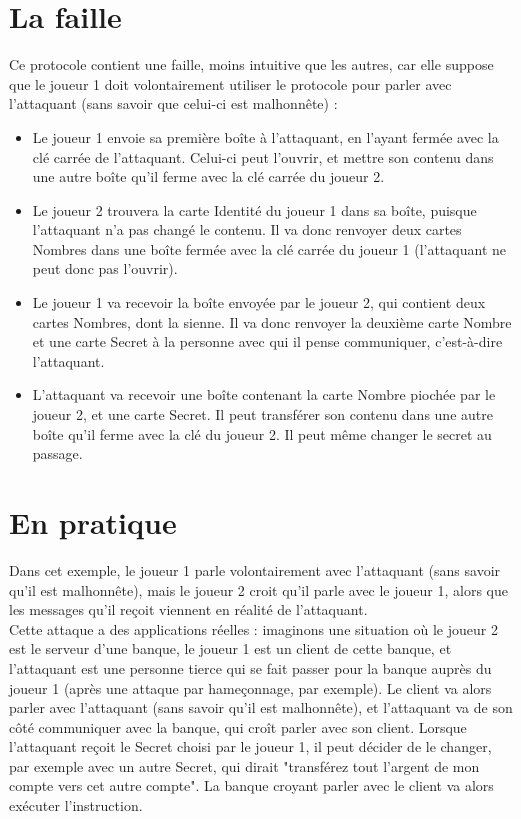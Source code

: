 \documentclass[a4paper,10pt]{article}
\begin{document}
\section{La faille}
Ce protocole contient une faille, moins intuitive que les autres, car elle suppose que le joueur 1 doit volontairement utiliser le protocole pour parler avec l'attaquant (sans savoir que celui-ci est malhonnête) :
\begin{itemize}
	\item Le joueur 1 envoie sa première boîte à l'attaquant, en l'ayant fermée avec la clé carrée de l'attaquant. Celui-ci peut l'ouvrir, et mettre son contenu dans une autre boîte qu'il ferme avec la clé carrée du joueur 2.
	\item Le joueur 2 trouvera la carte Identité du joueur 1 dans sa boîte, puisque l'attaquant n'a pas changé le contenu. Il va donc renvoyer deux cartes Nombres dans une boîte fermée avec la clé carrée du joueur 1 (l'attaquant ne peut donc pas l'ouvrir).
	\item Le joueur 1 va recevoir la boîte envoyée par le joueur 2, qui contient deux cartes Nombres, dont la sienne. Il va donc renvoyer la deuxième carte Nombre et une carte Secret à la personne avec qui il pense communiquer, c'est-à-dire l'attaquant.
	\item L'attaquant va recevoir une boîte contenant la carte Nombre piochée par le joueur 2, et une carte Secret. Il peut transférer son contenu dans une autre boîte qu'il ferme avec la clé du joueur 2. Il peut même changer le secret au passage.
\end{itemize}

\section{En pratique}
Dans cet exemple, le joueur 1 parle volontairement avec l'attaquant (sans savoir qu'il est malhonnête), mais le joueur 2 croit qu'il parle avec le joueur 1, alors que les messages qu'il reçoit viennent en réalité de l'attaquant.\\
Cette attaque a des applications réelles : imaginons une situation où le joueur 2 est le serveur d'une banque, le joueur 1 est un client de cette banque, et l'attaquant est une personne tierce qui se fait passer pour la banque auprès du joueur 1 (après une attaque par hameçonnage, par exemple). Le client va alors parler avec l'attaquant (sans savoir qu'il est malhonnête), et l'attaquant va de son côté communiquer avec la banque, qui croît parler avec son client. Lorsque l'attaquant reçoit le Secret choisi par le joueur 1, il peut décider de le changer, par exemple avec un autre Secret, qui dirait "transférez tout l'argent de mon compte vers cet autre compte". La banque croyant parler avec le client va alors exécuter l'instruction.
\end{document}
